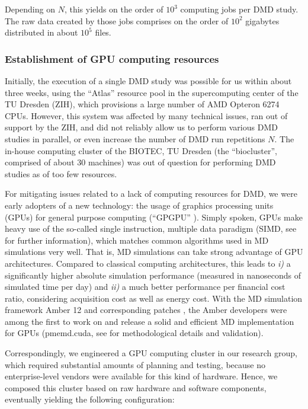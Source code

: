 Depending on $N$, this yields on the order of $10^3$ computing jobs per DMD
study. The raw data created by those jobs comprises on the order of $10^2$
gigabytes distributed in about $10^5$ files.


\subsubsection{Establishment of GPU computing resources}

Initially, the execution of a single DMD study was possible for us within about
three weeks, using the \enquote{Atlas} resource pool in the supercomputing
center of the TU Dresden (ZIH), which provisions a large number of AMD Opteron
6274 CPUs. However, this system was affected by many technical issues, ran out
of support by the ZIH, and did not reliably allow us to perform various DMD
studies in parallel, or even increase the number of DMD run repetitions $N$. The
in-house computing cluster of the BIOTEC, TU Dresden (the
\enquote{biocluster}, comprised of about 30 machines) was out of question for
performing DMD studies as of too few resources.

For mitigating issues related to a lack of computing resources for DMD, we were
early adopters of a new technology: the usage of graphics processing units
(GPUs) for general purpose computing (\enquote{GPGPU} \cite{wikipedia_gpgpu}).
Simply spoken, GPUs make heavy use of the so-called single instruction, multiple
data paradigm (SIMD, see \cite{kirk2012programming_gpus} for further
information), which matches common algorithms used in MD simulations very well.
That is, MD simulations can take strong advantage of GPU architectures. Compared
to classical computing architectures, this leads to \textit{i)} a significantly
higher absolute simulation performance (measured in nanoseconds of simulated
time per day) and \textit{ii)} a much better performance per financial cost
ratio, considering acquisition cost as well as energy cost. With the MD
simulation framework Amber 12 \cite{case_amber_12} and corresponding patches
\cite{amber_12_patches}, the Amber developers were among the first to work on
and release a solid and efficient MD implementation for GPUs (pmemd.cuda, see
\cite{amber_gpu_2012,amber_gpu_pme_2013} for methodological details and
validation).

Correspondingly, we engineered a GPU computing cluster in our research group,
which required substantial amounts of planning and testing, because no
enterprise-level vendors were available for this kind of hardware. Hence, we
composed this cluster based on raw hardware and software components, eventually
yielding the following configuration:

